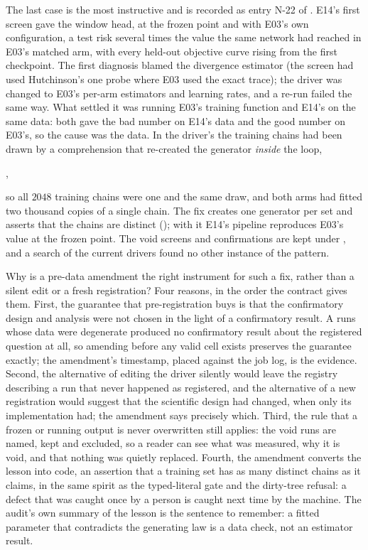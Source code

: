The last case is the most instructive and is recorded as entry N-22 of
. E14's first screen gave the window head, at the frozen
point and with E03's own configuration, a test risk several times the value the same
network had reached in E03's matched arm, with every held-out objective curve rising
from the first checkpoint. The first diagnosis blamed the divergence estimator (the
screen had used Hutchinson's one probe where E03 used the exact trace); the driver was
changed to E03's per-arm estimators and learning rates, and a re-run failed the same
way. What settled it was running E03's training function and E14's on the same data:
both gave the bad number on E14's data and the good number on E03's, so the cause was
the data. In the driver's  the training chains had been drawn by a
comprehension that re-created the generator \emph{inside} the loop,
\begin{center}
,
\end{center}
so all $2048$ training chains were one and the same draw, and both arms had fitted two thousand
copies of a single chain. The fix creates one generator per set and asserts that the
chains are distinct (); with it E14's pipeline
reproduces E03's value at the frozen point. The void screens and confirmations are kept
under , and a search of the current drivers found no
other instance of the pattern.

Why is a pre-data amendment the right instrument for such a fix, rather than a silent
edit or a fresh registration? Four reasons, in the order the contract gives them.
First, the guarantee that pre-registration buys is that the confirmatory design and
analysis were not chosen in the light of a confirmatory result. A runs whose data were
degenerate produced no confirmatory result about the registered question at all, so
amending before any valid cell exists preserves the guarantee exactly; the amendment's
timestamp, placed against the job log, is the evidence. Second, the alternative of
editing the driver silently would leave the registry describing a run that never
happened as registered, and the alternative of a new registration would suggest that the
scientific design had changed, when only its implementation had; the amendment says
precisely which. Third, the rule that a frozen or running output is never overwritten
still applies: the void runs are named, kept and excluded, so a reader can see what was
measured, why it is void, and that nothing was quietly replaced. Fourth, the amendment
converts the lesson into code, an assertion that a training set has as many distinct
chains as it claims, in the same spirit as the typed-literal gate and the
dirty-tree refusal: a defect that was caught once by a person is caught next time by the
machine. The audit's own summary of the lesson is the sentence to remember: a fitted
parameter that contradicts the generating law is a data check, not an estimator result.

